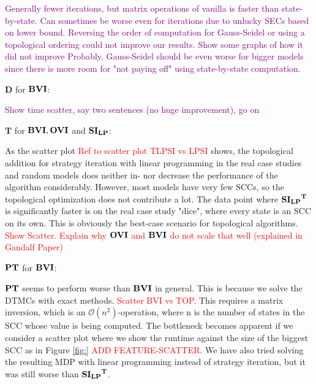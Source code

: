 \textcolor{purple}{Generally fewer iterations, but matrix operations of vanilla is faster than state-by-state.
Can sometimes be worse even for iterations due to unlucky SECs based on lower bound. 
Reversing the order of computation for Gauss-Seidel or using a topological ordering could not improve our results. Show some graphs of how it did not improve}
\textcolor{purple}{Probably, Gauss-Seidel should be even worse for bigger models since there is more room for "not paying off" using state-by-state computation.}


$\mathbf{D}$ for $\mathbf{BVI}$:

\textcolor{purple}{Show time scatter, say two sentences (no huge improvement), go on}

$\mathbf{T}$ for $\mathbf{BVI}, \mathbf{OVI}$ and $\mathbf{SI_{LP}}$:

As the scatter plot \textcolor{red}{Ref to scatter plot TLPSI vs LPSI} shows,
the topological addition for strategy iteration with linear programming in the real case studies and random models does 
neither in- nor decrease the performance of the algorithm considerably.
However, most models have very few SCCs, so the topological optimization does not contribute a lot.
The data point where $\mathbf{\mathbf{SI_{LP}}^T}$ is significantly faster is on the real case study "dice", where every state is an SCC on its own.
This is obviously the best-case scenario for topological algorithms.
\textcolor{red}{Show Scatter.
Explain why $\mathbf{OVI}$ and $\mathbf{BVI}$ do not scale that well (explained in Gandalf Paper)}

$\mathbf{PT}$ for $\mathbf{BVI}$:

$\mathbf{PT}$ seems to perform worse than $\mathbf{BVI}$ in general. This is because we solve the DTMCs with exact methods. 
\textcolor{red}{Scatter BVI vs TOP.}
This requires a matrix inversion, which is an $\mathcal{O}(n^{2})$-operation, where n is the number of states in the SCC whose value is being computed.
The bottleneck becomes apparent if we consider a scatter plot where we show the runtime against the size of the biggest SCC as in Figure \ref{fig:} \textcolor{red}{ADD FEATURE-SCATTER}.
We have also tried solving the resulting MDP with linear programming instead of strategy iteration, but it was still worse than $\mathbf{\mathbf{SI_{LP}}^T}$.


